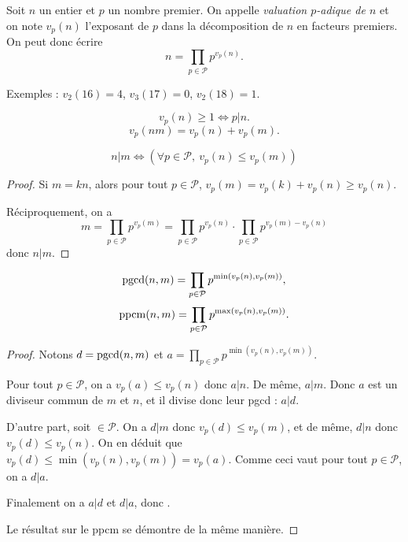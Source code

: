 \begin{definition}
Soit $n$ un entier et $p$ un nombre premier. On appelle \emph{valuation $p$-adique de $n$} et on note $v_p(n)$ l'exposant de $p$ dans la décomposition de $n$ en facteurs premiers. On peut donc écrire 
\[ n = \prod_{p\in \mathcal P} p^{v_p(n)}.\]
\end{definition}

Exemples : $v_2(16)=4$, $v_3(17)=0$, $v_2(18)=1$.

\begin{proposition}
\[ v_p(n)\geq 1 \iff p|n.\]
\[ v_p(nm) = v_p(n)+v_p(m).\]
\end{proposition}

\begin{proposition}
\[ 
n|m \iff \left(\forall p\in \mathcal P, \: v_p(n)\leq v_p(m)\right)
\]
\end{proposition}
\begin{proof}
Si $m = kn$, alors pour tout $p\in \mathcal P$, $v_p(m) = v_p(k)+v_p(n) \geq v_p(n)$.

Réciproquement, on a 
\[ 
m
= \prod_{p\in\mathcal P}p^{v_p(m)}
= \prod_{p\in\mathcal P}p^{v_p(n)} \cdot \prod_{p\in\mathcal P}p^{v_p(m)-v_p(n)}
\]
donc $n|m$.
\end{proof}

\begin{corollaire}
\[
\operatorname{pgcd}(n,m) = \prod_{p\in\mathcal P}p^{\min(v_p(n),v_p(m))},
\]
\[
\operatorname{ppcm}(n,m) = \prod_{p\in\mathcal P}p^{\max(v_p(n),v_p(m))}.
\]
\end{corollaire}
\begin{proof}
Notons $d=\operatorname{pgcd}(n,m)$ et $a = \prod_{p\in\mathcal P}p^{\min(v_p(n),v_p(m))}$.

Pour tout $p\in \mathcal P$, on a $v_p(a) \leq v_p(n)$ donc $a|n$. De même, $a|m$. Donc $a$ est un diviseur commun de $m$ et $n$, et il divise donc leur pgcd : $a|d$.

D'autre part, soit $\in \mathcal P$. On a $d|m$ donc $v_p(d)\leq v_p(m)$, et de même, $d|n$ donc $v_p(d)\leq v_p(n)$. On en déduit que $v_p(d) \leq \min(v_p(n),v_p(m)) = v_p(a)$. Comme ceci vaut pour tout $p\in \mathcal P$, on a $d|a$.

Finalement on a $a|d$ et $d|a$, donc .

Le résultat sur le ppcm se démontre de la même manière.
\end{proof}

